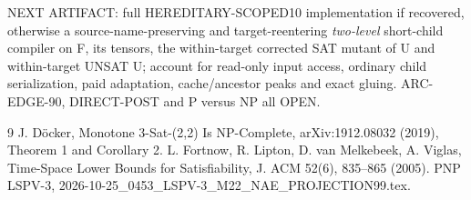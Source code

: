 \documentclass[11pt]{article}
\begin{document}
NEXT ARTIFACT: full HEREDITARY-SCOPED10 implementation if recovered, otherwise a source-name-preserving and target-reentering \emph{two-level} short-child compiler on F, its tensors, the within-target corrected SAT mutant of U and within-target UNSAT U; account for read-only input access, ordinary child serialization, paid adaptation, cache/ancestor peaks and exact gluing. ARC-EDGE-90, DIRECT-POST and P versus NP all OPEN.

\begin{thebibliography}{9}
 J. D\"ocker, Monotone 3-Sat-(2,2) Is NP-Complete, arXiv:1912.08032 (2019), Theorem 1 and Corollary 2.
 L. Fortnow, R. Lipton, D. van Melkebeek, A. Viglas, Time-Space Lower Bounds for Satisfiability, J. ACM 52(6), 835--865 (2005).
 PNP LSPV-3, 2026-10-25\_0453\_LSPV-3\_M22\_NAE\_PROJECTION99.tex.
\end{thebibliography}
\end{document}
